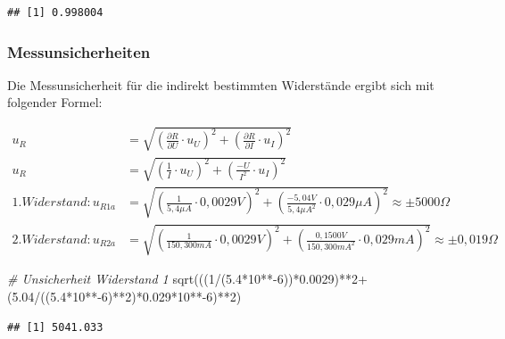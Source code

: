 \documentclass[
  9pt,
]{article}
\newenvironment{Shaded}{\begin{snugshade}}{\end{snugshade}}
\newcommand{\CommentTok}[1]{\textcolor[rgb]{0.56,0.35,0.01}{\textit{#1}}}
\newcommand{\DecValTok}[1]{\textcolor[rgb]{0.00,0.00,0.81}{#1}}
\newcommand{\FloatTok}[1]{\textcolor[rgb]{0.00,0.00,0.81}{#1}}
\newcommand{\FunctionTok}[1]{\textcolor[rgb]{0.00,0.00,0.00}{#1}}
\newcommand{\NormalTok}[1]{#1}
\newcommand{\SpecialCharTok}[1]{\textcolor[rgb]{0.00,0.00,0.00}{#1}}
\begin{document}
\begin{verbatim}
## [1] 0.998004
\end{verbatim}

\hypertarget{messunsicherheiten}{%
\subsubsection{Messunsicherheiten}\label{messunsicherheiten}}

Die Messunsicherheit für die indirekt bestimmten Widerstände ergibt sich
mit folgender Formel:

\begin {equation*}
\begin{split}
u_R &= \sqrt{\left (\frac{\partial R}{\partial U} \cdot u_U\right )^2 + \left (\frac{\partial R}{\partial I} \cdot u_I\right )^2 } \\
u_R &= \sqrt{\left (\frac{1}{I} \cdot u_U\right )^2 + \left (\frac{-U}{I^2} \cdot u_I\right )^2 } \\
1.Widerstand: u_{R1a}&= \sqrt{\left (\frac{1}{5,4\mu A} \cdot 0,0029V\right )^2 + \left (\frac{-5,04V}{5,4\mu A^2} \cdot 0,029 \mu A\right )^2 } \approx \pm 5000\Omega \\
2.Widerstand: u_{R2a}&= \sqrt{\left (\frac{1}{150,300mA} \cdot 0,0029V \right )^2 + \left (\frac{0,1500V}{150,300mA^2} \cdot 0,029mA\right )^2 } \approx \pm 0,019 \Omega
\end{split}
\end{equation*}

\begin{Shaded}
\begin{Highlighting}[]
\CommentTok{\# Unsicherheit Widerstand 1}
\FunctionTok{sqrt}\NormalTok{(((}\DecValTok{1}\SpecialCharTok{/}\NormalTok{(}\FloatTok{5.4}\SpecialCharTok{*}\DecValTok{10}\SpecialCharTok{**{-}}\DecValTok{6}\NormalTok{))}\SpecialCharTok{*}\FloatTok{0.0029}\NormalTok{)}\SpecialCharTok{**}\DecValTok{2}\SpecialCharTok{+}\NormalTok{(}\FloatTok{5.04}\SpecialCharTok{/}\NormalTok{((}\FloatTok{5.4}\SpecialCharTok{*}\DecValTok{10}\SpecialCharTok{**{-}}\DecValTok{6}\NormalTok{)}\SpecialCharTok{**}\DecValTok{2}\NormalTok{)}\SpecialCharTok{*}\FloatTok{0.029}\SpecialCharTok{*}\DecValTok{10}\SpecialCharTok{**{-}}\DecValTok{6}\NormalTok{)}\SpecialCharTok{**}\DecValTok{2}\NormalTok{)}
\end{Highlighting}
\end{Shaded}

\begin{verbatim}
## [1] 5041.033
\end{verbatim}
\end{document}

